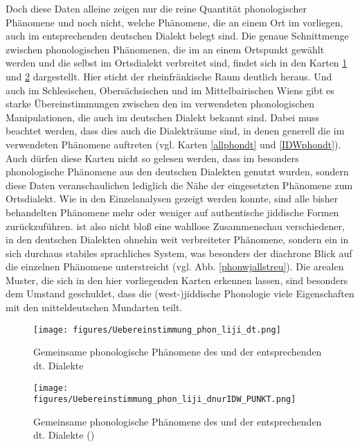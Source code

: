 	Doch diese Daten alleine zeigen nur die reine Quantität phonologischer Phänomene und noch nicht, welche Phänomene, die an einem Ort im  vorliegen, auch im entsprechenden deutschen Dialekt belegt sind. Die genaue Schnittmenge zwischen phonologischen Phänomenen, die im  an einem Ortspunkt gewählt werden und die selbst im Ortsdialekt verbreitet sind, findet sich in den Karten \ref{allphondtliji} und \ref{IDWallphondtliji} dargestellt. Hier sticht der rheinfränkische Raum deutlich heraus. Und auch im Schlesischen, Obersächsischen und im Mittelbairischen Wiens gibt es starke Übereinstimmungen zwischen den im  verwendeten phonologischen Manipulationen, die auch im deutschen Dialekt bekannt sind. Dabei muss beachtet werden, dass dies auch die Dialekträume sind, in denen generell die im  verwendeten Phänomene auftreten (vgl. Karten \ref{allphondt} und \ref{IDWphondt}). Auch dürfen diese Karten nicht so gelesen werden, dass im  besonders phonologische Phänomene aus den deutschen Dialekten genutzt wurden, sondern diese Daten veranschaulichen lediglich die Nähe der eingesetzten Phänomene zum Ortsdialekt. Wie in den Einzelanalysen gezeigt werden konnte, sind alle bisher behandelten Phänomene mehr oder weniger auf authentische jiddische Formen zurückzuführen.  ist also nicht bloß eine wahllose Zusammenschau verschiedener, in den deutschen Dialekten ohnehin weit verbreiteter Phänomene, sondern ein in sich durchaus stabiles  sprachliches System, was besonders der diachrone Blick auf die einzelnen Phänomene unterstreicht (vgl. Abb. \ref{phonwjallstreu}). Die arealen Muster, die sich in den hier vorliegenden Karten erkennen lassen, sind besonders dem Umstand geschuldet, dass die (west-)jiddische Phonologie viele Eigenschaften mit den mitteldeutschen Mundarten teilt.\\


 \begin{figure}[h!]
		\centering
\texttt{[image: figures/Uebereinstimmung\_phon\_liji\_dt.png]}
		\caption{\label{allphondtliji} Gemeinsame phonologische Phänomene des  und der entsprechenden dt. Dialekte}
		\end{figure}
 
 
 
 \begin{figure}[h!]
		\centering
\texttt{[image: figures/Uebereinstimmung\_phon\_liji\_dnurIDW\_PUNKT.png]}
		\caption{\label{IDWallphondtliji} Gemeinsame phonologische Phänomene des  und der entsprechenden dt. Dialekte ()}
		\end{figure}
\FloatBarrier
  
